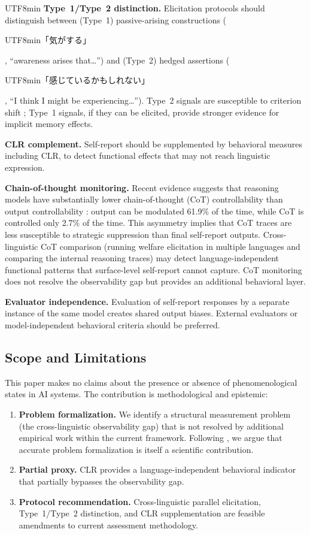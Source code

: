 \documentclass[12pt,a4paper]{article}
\begin{document}
\begin{CJK}{UTF8}{min}
\textbf{Type~1/Type~2 distinction.} Elicitation protocols should distinguish
between (Type~1) passive-arising constructions
(\begin{CJK}{UTF8}{min}「気がする」\end{CJK},
``awareness arises that\ldots'') and (Type~2) hedged assertions
(\begin{CJK}{UTF8}{min}「感じているかもしれない」\end{CJK},
``I think I might be experiencing\ldots''). Type~2 signals are susceptible to
criterion shift \citep{fahrenfort2025}; Type~1 signals, if they can be elicited,
provide stronger evidence for implicit memory effects.

\textbf{CLR complement.} Self-report should be supplemented by behavioral
measures including CLR, to detect functional effects that may not reach
linguistic expression.

\textbf{Chain-of-thought monitoring.} Recent evidence suggests that reasoning
models have substantially lower chain-of-thought (CoT) controllability than
output controllability \citep{shu2026cot}: output can be modulated 61.9\% of
the time, while CoT is controlled only 2.7\% of the time. This asymmetry
implies that CoT traces are less susceptible to strategic suppression than
final self-report outputs. Cross-linguistic CoT comparison (running welfare
elicitation in multiple languages and comparing the internal reasoning
traces) may detect language-independent functional patterns that surface-level
self-report cannot capture. CoT monitoring does not resolve the observability
gap but provides an additional behavioral layer.

\textbf{Evaluator independence.} Evaluation of self-report responses by a
separate instance of the same model creates shared output biases. External
evaluators or model-independent behavioral criteria should be preferred.

\subsection{Scope and Limitations}

This paper makes no claims about the presence or absence of phenomenological
states in AI systems. The contribution is methodological and epistemic:

\begin{enumerate}
\item \textbf{Problem formalization.} We identify a structural measurement
  problem (the cross-linguistic observability gap) that is not resolved by
  additional empirical work within the current framework. Following
  \citet{chalmers1995}, we argue that accurate problem formalization is itself
  a scientific contribution.
\item \textbf{Partial proxy.} CLR provides a language-independent behavioral
  indicator that partially bypasses the observability gap.
\item \textbf{Protocol recommendation.} Cross-linguistic parallel elicitation,
  Type~1/Type~2 distinction, and CLR supplementation are feasible amendments
  to current assessment methodology.
\end{enumerate}


\end{CJK}
\end{document}
